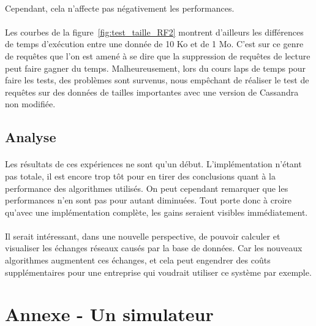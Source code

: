 \documentclass[12pt]{article}
\begin{document}
\paragraph{}Cependant, cela n'affecte pas négativement les performances.

\paragraph{}Les courbes de la figure~\ref{fig:test_taille_RF2} montrent d'ailleurs les différences de temps d'exécution entre une donnée de 10 Ko et de 1 Mo. C'est sur ce genre de requêtes que l'on est amené à se dire que la suppression de requêtes de lecture peut faire gagner du temps. Malheureusement, lors du cours laps de temps pour faire les tests, des problèmes sont survenus, nous empêchant de réaliser le test de requêtes sur des données de tailles importantes avec une version de Cassandra non modifiée.

\subsection{Analyse}

\paragraph{}Les résultats de ces expériences ne sont qu'un début. L'implémentation n'étant pas totale, il est encore trop tôt pour en tirer des conclusions quant à la performance des algorithmes utilisés. On peut cependant remarquer que les performances n'en sont pas pour autant diminuées. Tout porte donc à croire qu'avec une implémentation complète, les gains seraient visibles immédiatement.

\paragraph{}Il serait intéressant, dans une nouvelle perspective, de pouvoir calculer et visualiser les échanges réseaux causés par la base de données. Car les nouveaux algorithmes augmentent ces échanges, et cela peut engendrer des coûts supplémentaires pour une entreprise qui voudrait utiliser ce système par exemple.

\newpage

\section{Annexe - Un simulateur}
\end{document}

